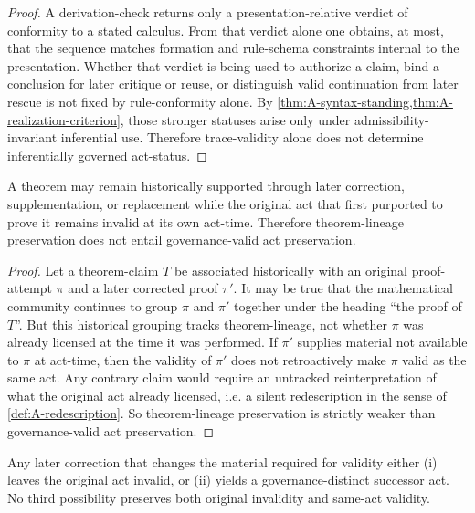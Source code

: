 \begin{proof}
A derivation-check returns only a presentation-relative verdict of conformity to a stated calculus. From that verdict alone one obtains, at most, that the sequence matches formation and rule-schema constraints internal to the presentation. Whether that verdict is being used to authorize a claim, bind a conclusion for later critique or reuse, or distinguish valid continuation from later rescue is not fixed by rule-conformity alone. By \cref{thm:A-syntax-standing,thm:A-realization-criterion}, those stronger statuses arise only under admissibility-invariant inferential use. Therefore trace-validity alone does not determine inferentially governed act-status.
\end{proof}

\begin{theorem}
\label{thm:A-acttime-stricter}
A theorem may remain historically supported through later correction, supplementation, or replacement while the original act that first purported to prove it remains invalid at its own act-time. Therefore theorem-lineage preservation does not entail governance-valid act preservation.
\end{theorem}

\begin{proof}
Let a theorem-claim $T$ be associated historically with an original proof-attempt $\pi$ and a later corrected proof $\pi'$. It may be true that the mathematical community continues to group $\pi$ and $\pi'$ together under the heading ``the proof of $T$''. But this historical grouping tracks theorem-lineage, not whether $\pi$ was already licensed at the time it was performed. If $\pi'$ supplies material not available to $\pi$ at act-time, then the validity of $\pi'$ does not retroactively make $\pi$ valid as the same act. Any contrary claim would require an untracked reinterpretation of what the original act already licensed, i.e. a silent redescription in the sense of \cref{def:A-redescription}. So theorem-lineage preservation is strictly weaker than governance-valid act preservation.
\end{proof}

\begin{theorem}
\label{thm:A-repair-disjoint}
Any later correction that changes the material required for validity either
(i) leaves the original act invalid, or
(ii) yields a governance-distinct successor act.
No third possibility preserves both original invalidity and same-act validity.
\end{theorem}


